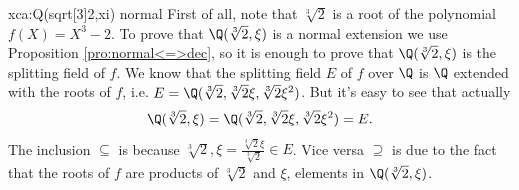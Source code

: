 \begin{sol}{xca:Q(sqrt[3]{2},xi) normal}
First of all, note that $\sqrt[3]{2}$ is a root of
the polynomial $f(X)=X^3-2$.
To prove that $\Q(\sqrt[3]{2},\xi)$ is a normal extension 
we use Proposition \ref{pro:normal<=>dec},
so it is enough to prove
that $\Q(\sqrt[3]{2},\xi)$ is the splitting field of $f$.
We know that the splitting field $E$ of $f$ over $\Q$ is
$\Q$ extended with the roots of $f$, i.e.
$E=\Q(\sqrt[3]{2},\sqrt[3]{2}\xi,\sqrt[3]{2}\xi^2)$.
But it's easy to see that actually 
\[
\Q(\sqrt[3]{2},\xi)=\Q(\sqrt[3]{2},\sqrt[3]{2}\xi,\sqrt[3]{2}\xi^2)=E.
\]
The inclusion $\subseteq$ is because $\sqrt[3]{2},  \xi=\frac{\sqrt[3]{2}\xi}{\sqrt[3]{2}}\in E$. 
Vice versa $\supseteq$ is due to the fact that 
the roots of $f$ are products of $\sqrt[3]{2}$ and $\xi$, elements in $\Q(\sqrt[3]{2},\xi)$.
\end{sol}


